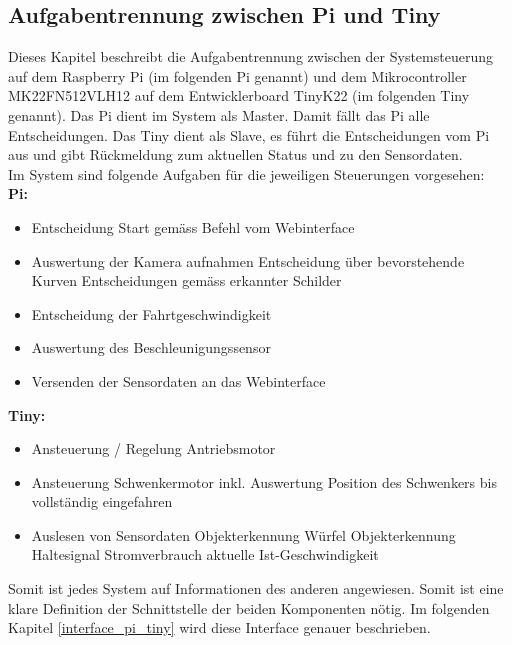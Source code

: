 \documentclass[../../main.tex]{subfiles}
\begin{document}
    \subsection{Aufgabentrennung zwischen Pi und Tiny} \label{aufgabentrennung_pi_tiny}
    Dieses Kapitel beschreibt die Aufgabentrennung zwischen der Systemsteuerung auf dem Raspberry Pi (im folgenden Pi genannt) und dem Mikrocontroller MK22FN512VLH12 auf dem Entwicklerboard TinyK22 (im folgenden Tiny genannt). Das Pi dient im System als Master. Damit fällt das Pi alle Entscheidungen. Das Tiny dient als Slave, es führt die Entscheidungen vom Pi aus und gibt Rückmeldung zum aktuellen Status und zu den Sensordaten.\\
    Im System sind folgende Aufgaben für die jeweiligen Steuerungen vorgesehen:\\
    \textbf{Pi:}
    \begin{itemize}
        \item Entscheidung Start gemäss Befehl vom Webinterface
        \item Auswertung der Kamera aufnahmen
            \subitem Entscheidung über bevorstehende Kurven
            \subitem Entscheidungen gemäss erkannter Schilder
        \item Entscheidung der Fahrtgeschwindigkeit
        \item Auswertung des Beschleunigungssensor
        \item Versenden der Sensordaten an das Webinterface
    \end{itemize}

    \textbf{Tiny:}
    \begin{itemize}
        \item Ansteuerung / Regelung Antriebsmotor
        \item Ansteuerung Schwenkermotor
            \subitem inkl. Auswertung Position des Schwenkers bis vollständig eingefahren
        \item Auslesen von Sensordaten
            \subitem Objekterkennung Würfel
            \subitem Objekterkennung Haltesignal
            \subitem Stromverbrauch
            \subitem aktuelle Ist-Geschwindigkeit
    \end{itemize}

    Somit ist jedes System auf Informationen des anderen angewiesen. Somit ist eine klare Definition der Schnittstelle der beiden Komponenten nötig. Im folgenden Kapitel \ref{interface_pi_tiny} wird diese Interface genauer beschrieben.
\end{document}
